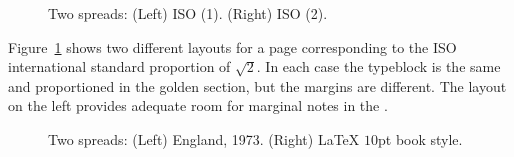 \documentclass[10pt,a4paper,oneside,extrafontsizes]{memoir}%
\newcommand\U[2]{\textrm{#1}\,\textrm{#2}}
\begin{document}
\begin{figure}
\centering
\begin{minipage}[b]{\pwlayi}
\end{minipage}
\hfill
\begin{minipage}[b]{\pwlayi}
\end{minipage}
\caption[Two spreads for ISO page sizes]%
        {Two spreads: (Left) ISO (1).
         (Right) ISO (2).} \label{fb:12}
\end{figure}

\begin{paracol}{2}
\switchEng
    Figure~\ref{fb:12} shows two different layouts for a page corresponding
to the ISO international standard proportion of $\sqrt{2}$. In each case
the typeblock is the same and proportioned in the 
golden section, but the margins are 
different. The layout on the left provides adequate
room for marginal notes in the \foredge.
\end{paracol}

\begin{figure}
\centering
\begin{minipage}[b]{\pwlayi}
\end{minipage}
\hfill
\begin{minipage}[b]{\pwlayi}
\end{minipage}
\caption[Two spreads: England, 1973 and LaTeX $\U{10}{pt}$ book style]%
        {Two spreads: (Left) England, 1973.
         (Right) LaTeX $10$pt book style.} \label{fb:13}
\end{figure}
\end{document}

